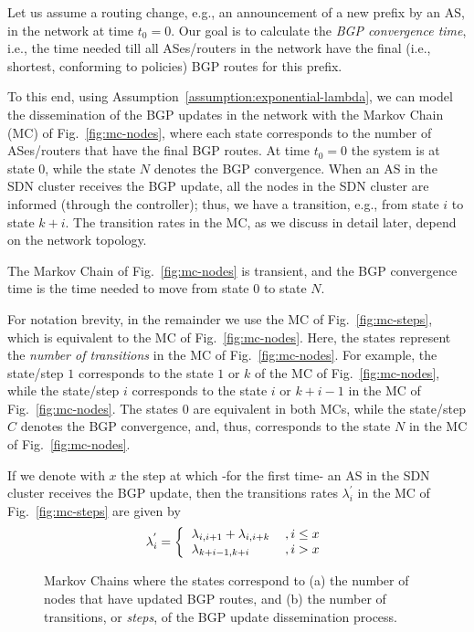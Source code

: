 Let us assume a routing change, e.g., an announcement of a new prefix by an AS, in the network at time $t_{0}=0$. Our goal is to calculate the \textit{BGP convergence time}, i.e., the time needed till all ASes/routers in the network have the final (i.e., shortest, conforming to policies) BGP routes for this prefix.


To this end, using Assumption~\ref{assumption:exponential-lambda}, we can model the dissemination of the BGP updates in the network with the Markov Chain (MC) of Fig.~\ref{fig:mc-nodes}, where each state corresponds to the number of ASes/routers that have the final BGP routes. At time $t_{0}=0$ the system is at state $0$, while the state $N$ denotes the BGP convergence. When an AS in the SDN cluster receives the BGP update, all the nodes in the SDN cluster are informed (through the controller); thus, we have a transition, e.g., from state $i$ to state $k+i$. The transition rates in the MC, as we discuss in detail later, depend on the network topology.


The Markov Chain of Fig.~\ref{fig:mc-nodes} is transient, and the BGP convergence time is the time needed to move from state $0$ to state $N$.

For notation brevity, in the remainder we use the MC of Fig.~\ref{fig:mc-steps}, which is equivalent to the MC of Fig.~\ref{fig:mc-nodes}. Here, the states represent the \textit{number of transitions} in the MC of Fig.~\ref{fig:mc-nodes}. For example, the state/step $1$ corresponds to the state $1$ or $k$ of the MC of Fig.~\ref{fig:mc-nodes}, while the state/step $i$ corresponds to the state $i$ or $k+i-1$ in the MC of Fig.~\ref{fig:mc-nodes}. The states $0$ are equivalent in both MCs, while the state/step $C$ denotes the BGP convergence, and, thus, corresponds to the state $N$ in the MC of Fig.~\ref{fig:mc-nodes}. 

If we denote with $x$ the step at which -for the first time- an AS in the SDN cluster receives the BGP update, then the transitions rates $\lambda_{i}^{'}$ in the MC of Fig.~\ref{fig:mc-steps} are given by
\begin{equation}
\lambda_{i}^{'} = \left\{
\begin{tabular}{ll}
$\lambda_{i,i+1}+\lambda_{i,i+k}$		&$, i\leq x$\\
$\lambda_{k+i-1, k+i}$					&$, i>x$
\end{tabular}
\right.
\end{equation}


\begin{figure}
\caption{Markov Chains where the states correspond to (a) the number of nodes that have updated BGP routes, and (b) the number of transitions, or \textit{steps}, of the BGP update dissemination process.}
\label{fig:markov-chains}
\end{figure}



